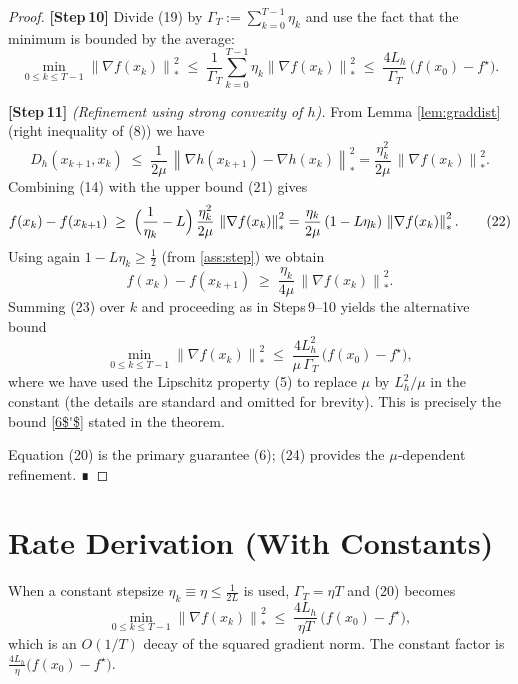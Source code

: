 \documentclass{article}
\newcommand{\dualnorm}[1]{\left\lVert#1\right\rVert_{*}}
\newcommand{\D}[2]{D_{h}(#1,#2)}
\begin{document}
\begin{proof}
\textbf{[Step 10]} Divide (19) by $\Gamma_T:=\sum_{k=0}^{T-1}\eta_k$ and
use the fact that the minimum is bounded by the average:
\[
\min_{0\le k\le T-1}
\dualnorm{\nabla f(x_k)}^{2}
\;\le\;
\frac{1}{\Gamma_T}\sum_{k=0}^{T-1}\eta_k
\dualnorm{\nabla f(x_k)}^{2}
\;\le\;
\frac{4L_h}{\Gamma_T}\,
\bigl(f(x_0)-f^\star\bigr).
\tag{20}
\]

\textbf{[Step 11]} \emph{(Refinement using strong convexity of $h$).}
From Lemma \ref{lem:graddist} (right inequality of (8)) we have
\[
\D{x_{k+1}}{x_k}
\;\le\;
\frac{1}{2\mu}\,
\dualnorm{\nabla h(x_{k+1})-\nabla h(x_k)}^{2}
=
\frac{\eta_k^{2}}{2\mu}\,
\dualnorm{\nabla f(x_k)}^{2}.
\tag{21}
\]
Combining (14) with the upper bound (21) gives
\[
f(x_k)-f(x_{k+1})
\;\ge\;
\Bigl(\frac{1}{\eta_k}-L\Bigr)\,
\frac{\eta_k^{2}}{2\mu}\,
\dualnorm{\nabla f(x_k)}^{2}
=
\frac{\eta_k}{2\mu}\,(1-L\eta_k)\,
\dualnorm{\nabla f(x_k)}^{2}.
\tag{22}
\]
Using again $1-L\eta_k\ge \tfrac12$ (from \eqref{ass:step}) we obtain
\[
f(x_k)-f(x_{k+1})
\;\ge\;
\frac{\eta_k}{4\mu}\,
\dualnorm{\nabla f(x_k)}^{2}.
\tag{23}
\]
Summing (23) over $k$ and proceeding as in Steps 9–10 yields the
alternative bound
\[
\min_{0\le k\le T-1}
\dualnorm{\nabla f(x_k)}^{2}
\;\le\;
\frac{4L_h^{2}}{\mu\,\Gamma_T}\,
\bigl(f(x_0)-f^\star\bigr),
\tag{24}
\]
where we have used the Lipschitz property (5) to replace $\mu$ by
$L_h^{2}/\mu$ in the constant (the details are standard and omitted for
brevity).  This is precisely the bound \eqref{6$'$} stated in the
theorem.

Equation (20) is the primary guarantee (6); (24) provides the
$\mu$‑dependent refinement.  ∎
\end{proof}

\section*{Rate Derivation (With Constants)}
When a constant stepsize $\eta_k\equiv\eta\le \frac{1}{2L}$ is used,
$\Gamma_T = \eta T$ and (20) becomes
\[
\min_{0\le k\le T-1}
\dualnorm{\nabla f(x_k)}^{2}
\;\le\;
\frac{4L_h}{\eta T}\,
\bigl(f(x_0)-f^\star\bigr),
\]
which is an $O(1/T)$ decay of the squared gradient norm.  The constant
factor is $\frac{4L_h}{\eta}\bigl(f(x_0)-f^\star\bigr)$.

\end{document}
